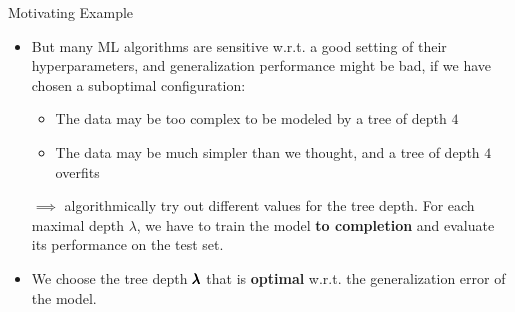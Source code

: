 \begin{frame}{Motivating Example}
\framebreak

\begin{itemize}
\item But many ML algorithms are sensitive w.r.t. a good setting of their hyperparameters,
and generalization performance might be bad, if we have chosen a suboptimal configuration:
\begin{itemize}
\item The data may be too complex to be modeled by a tree of depth $4$
\item The data may be much simpler than we thought, and a tree of depth $4$ overfits
\end{itemize}
\item[$\implies$] algorithmically try out different values for the tree depth. For each maximal depth $\lambda$, we have to train the model \textbf{to completion} and evaluate its performance on the test set.
\item We choose the tree depth $\pmb{\lambda}$ that is \textbf{optimal} w.r.t. the generalization error of the model.
\end{itemize}


\end{frame}



